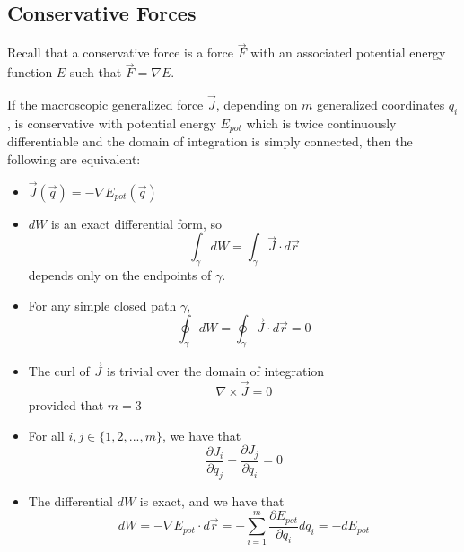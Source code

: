\documentclass[12pt, a4paper, oneside, openright, titlepage]{book}
\begin{document}
\subsection{Conservative Forces}

\begin{rec}
    Recall that a conservative force is a force $\vec{F}$ with an associated potential energy function $E$ such that $\vec{F} = \nabla E$.
\end{rec}

\begin{prop}
    If the macroscopic generalized force $\vec{J}$, depending on $m$ generalized coordinates $q_i$, is conservative with potential energy $E_{pot}$ which is twice continuously differentiable and the domain of integration is simply connected, then the following are equivalent:
    \begin{itemize}
        \item $\vec{J}(\vec{q}) = -\nabla E_{pot}(\vec{q})$
        \item $dW$ is an exact differential form, so $$\int_{\gamma}dW = \int_{\gamma}\vec{J}\cdot d\vec{r}$$ depends only on the endpoints of $\gamma$.
        \item For any simple closed path $\gamma$, $$\oint_{\gamma}dW = \oint_{\gamma}\vec{J}\cdot d\vec{r} = 0$$
        \item The curl of $\vec{J}$ is trivial over the domain of integration $$\nabla \times \vec{J} = 0$$ provided that $m = 3$
        \item For all $i,j \in \{1,2,...,m\}$, we have that \begin{equation*}
                \frac{\partial J_i}{\partial q_j} - \frac{\partial J_j}{\partial q_i} = 0
        \end{equation*}
        \item The differential $dW$ is exact, and we have that \begin{equation*}
                dW = -\nabla E_{pot}\cdot d\vec{r} = -\sum_{i=1}^m\frac{\partial E_{pot}}{\partial q_i}dq_i = -dE_{pot}
        \end{equation*}
    \end{itemize}
\end{prop}
\end{document}
